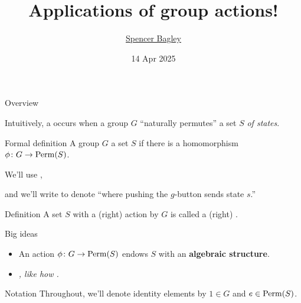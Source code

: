 \documentclass[8pt, handout]{beamer}
\title[Applications of group actions!]{Applications of group actions!}
\author[\href{mailto:sbagley@westminsteru.edu}{S. Bagley}]
       {\href{mailto:sbagley@westminsteru.edu}{Spencer Bagley}}
\institute[Westminster] { 
  \normalsize With many thanks to Matthew Macauley, \\
  \url{http://www.math.clemson.edu/~macaule/}}
\date[14 Apr 2025]{14 Apr 2025}
\newcommand{\Pause}{\pause}      %
\begin{document}
\frame{\titlepage}


\begin{frame}{Overview} %

  Intuitively, a  occurs when a group $G$
  ``naturally permutes'' a set $S$ \emph{of states}.

  \medskip

  \begin{block}{Formal definition}
    A group $G$  a set $S$ if there is a homomorphism
    $\phi\colon G\to\operatorname{Perm}(S)$. 

    We'll use ,
    
    and we'll write  to denote ``where pushing the $g$-button sends state $s$.''
  \end{block} 

  \begin{block}{Definition}
    A set $S$ with a (right) action by $G$ is called a (right)
    .
  \end{block} 
  
  \begin{alertblock}{Big ideas}
   \begin{itemize}
    \item An action $\phi\colon G\to\operatorname{Perm}(S)$ endows $S$ with an
      \textbf{algebraic structure}. 
    \item \emph{, like how
      .}
    \end{itemize}
  \end{alertblock}

  \begin{exampleblock}{Notation}
    Throughout, we'll denote identity elements by $1\in G$ and $e\in\operatorname{Perm}(S)$.
  \end{exampleblock}
  
\end{frame}

\end{document}
